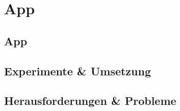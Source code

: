 \chapter{App}

\section{App}



\section{Experimente \& Umsetzung}


\section{Herausforderungen \& Probleme}